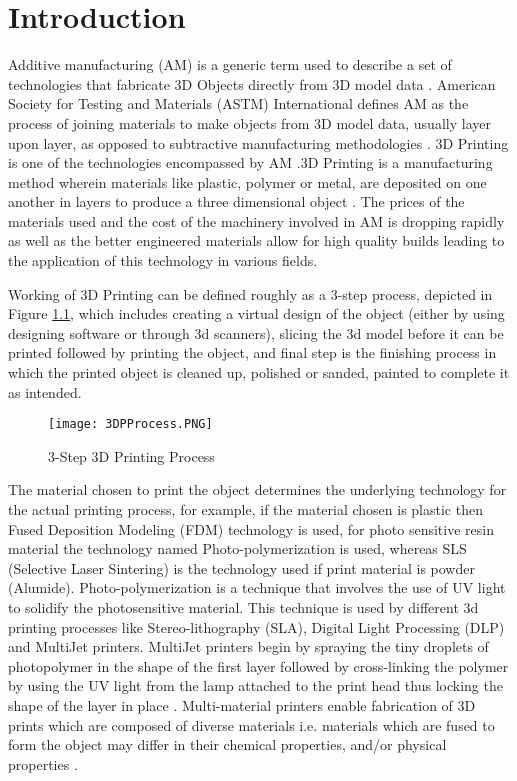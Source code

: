 \chapter{Introduction}
Additive manufacturing (AM) is a generic term used to describe a set of technologies that fabricate 3D Objects directly from 3D model data \cite{KRUTH}. American Society for Testing and Materials (ASTM) International defines AM as the process of joining materials to make objects from 3D model data, usually layer upon layer, as opposed to subtractive manufacturing methodologies \cite{cwig} . 3D Printing is one of the technologies encompassed by AM \cite{Conner}.3D Printing is a manufacturing method  wherein materials like plastic, polymer or metal, are deposited on one another in layers to produce a three dimensional object \cite{sdl}.  The prices of the materials used and the cost of the machinery involved in AM is dropping rapidly as well as the better engineered materials allow for high quality builds leading to the application of this technology in various fields. \newline

Working of 3D Printing can be defined roughly as a 3-step process, depicted in Figure \ref{fig:3DP}, which includes creating a virtual design of the object (either by using designing software or through 3d scanners), slicing the 3d model before it can be printed followed by printing the object, and final step is the finishing process in which the printed object is cleaned up, polished or sanded, painted to complete it as intended.  
\begin{figure}[ht!]
\centering
\texttt{[image: 3DPProcess.PNG]}
\caption{3-Step 3D Printing Process}
\label{fig:3DP}
\end{figure}

The material chosen to print the object determines the underlying technology for the actual printing process, for example, if the material chosen is plastic then Fused Deposition Modeling (FDM) technology is used, for photo sensitive resin material the technology named Photo-polymerization is used, whereas SLS (Selective Laser Sintering) is the technology used if print material is powder (Alumide). Photo-polymerization is a technique that involves the use of UV light to solidify the photosensitive material.  This technique is used by different 3d printing processes like Stereo-lithography (SLA), Digital Light Processing (DLP) and MultiJet printers.  MultiJet printers begin by spraying the tiny droplets of photopolymer in the shape of the first layer followed by cross-linking the polymer by using the UV light from the lamp attached to the print head thus locking the shape of the layer in place \cite{dpW}. Multi-material printers enable fabrication of 3D prints which are composed of diverse materials i.e. materials which are fused to form the object may differ in their chemical properties, and/or physical properties \cite{Doubrovski}.\newline

